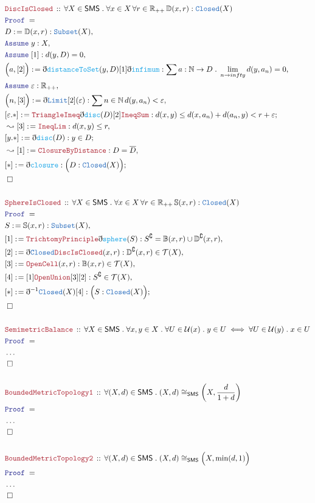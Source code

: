 \documentclass[12pt]{scrartcl}
\newcommand{\TYPE}[1]{\textcolor{NavyBlue}{\mathtt{#1}}}
\newcommand{\FUNC}[1]{\textcolor{Cerulean}{\mathtt{#1}}}
\newcommand{\LOGIC}[1]{\textcolor{Blue}{\mathtt{#1}}}
\newcommand{\THM}[1]{\textcolor{Maroon}{\mathtt{#1}}}
\renewcommand{\.}{\; . \;}
\newcommand{\de}{: \kern 0.1pc =}
\newcommand{\Theorem}[2]{& \THM{#1} \, :: \, #2 \\ & \Proof = \\ }
\newcommand{\Page}[1]{ \begin{align*} #1 \end{align*}   }
\newcommand{ \bd }{ \ByDef }
\newcommand{\NoProof}{ & \ldots \\ \EndProof}
\newcommand{\Reals}{\mathbb{R} }
\newcommand{\Nat}{\mathbb{N} }
\renewcommand{\c}{\complement}
\newcommand{\Say}[3]{& #1 \de #2 : #3, \\}
\newcommand{\Conclude}[3]{& #1 \de #2 : #3; \\}
\newcommand{\Derive}[3]{& \leadsto #1 \de #2 : #3, \\}
\newcommand{\Assume}[2]{& \LOGIC{Assume} \; #1 : #2, \\}
\newcommand{\QED}{\; \square}
\newcommand{\EndProof}{& \QED \\}
\newcommand{\ByDef}{\eth}
\newcommand{\Proof}{\LOGIC{Proof} \; }
\newcommand{\T}{\mathcal{T}}
\renewcommand{\U}{\mathcal{U}}
\newcommand{\SMS}{\mathsf{SMS}}
\begin{document}
\Page{
	\Theorem{DiscIsClosed}
	{
		\forall X \in \SMS \. \forall x \in X \, \forall r \in \Reals_{++} \, \mathbb{D}(x,r) : \TYPE{Closed}(X)
	}
	\Say{D}{\mathbb{D}(x,r)}{\TYPE{Subset}(X)}
	\Assume{y}{X}
	\Assume{[1]}{d(y,D) = 0}
	\Say{\Big(a,[2] \Big)}{\bd \FUNC{distanceToSet}(y,D)[1]\bd \FUNC{infimum}}{\sum a : \Nat \to D \. \lim_{n \to infty} d(y, a_n) = 0}
	\Assume{\varepsilon}{\Reals_{++}}
	\Say{\Big(n,[3]\Big)}{\bd \TYPE{Limit}[2](\varepsilon)}{\sum n \in \Nat \, d(y,a_n) < \varepsilon}
	\Conclude{[\varepsilon.*]}{\THM{TriangleIneq}\bd \FUNC{disc}(D) [2] \THM{IneqSum}}{d(x,y) \le d(x,a_n) + d(a_n,y) <  r + \varepsilon}
	\Derive{[3]}{\THM{IneqLim}}{d(x,y) \le r }
	\Conclude{[y.*]}{\bd \FUNC{disc}(D)}{y \in D }
	\Derive{[1]}{\THM{ClosureByDistance}}{D = \overline{D}}
	\Conclude{[*]}{\bd \FUNC{closure}}{\Big( D : \TYPE{Closed}(X) \Big)}
	\EndProof
	\\
	\Theorem{SphereIsClosed}
	{
		\forall X \in \SMS \. \forall x \in X \, \forall r \in \Reals_{++} \, \mathbb{S}(x,r) : \TYPE{Closed}(X)
	}
	\Say{S}{\mathbb{S}(x,r)}{\TYPE{Subset}(X)}
	\Say{[1]}{\THM{TrichtomyPrinciple}\bd \FUNC{sphere}(S)}{S^\c = \mathbb{B}(x,r) \cup \mathbb{D}^\c(x,r)}
	\Say{[2]}{\bd  \TYPE{Closed} \THM{DiscIsClosed}(x,r)}{\mathbb{D}^\c(x,r) \in \T(X)}
	\Say{[3]}{\THM{OpenCell}(x,r)}{\mathbb{B}(x,r) \in \T(X)}
	\Say{[4]}{ [1] \THM{OpenUnion}[3] [2]  }{S^\c  \in \T(X)}
	\Conclude{[*]}{\bd^{-1} \TYPE{Closed}(X)[4]}{\Big(S : \TYPE{Closed}(X) \Big) }
	\EndProof
	\\
	\Theorem{SemimetricBalance}
	{
		\forall X \in \SMS \. \forall x,y \in X \. 
		\forall U \in \U(x) \. y \in U \iff \forall U \in \U(y) \. x \in U  
	}
	\NoProof
	\\
	\Theorem{BoundedMetricTopology1}{\forall (X,d) \in \SMS \.   (X,d)  \cong_{\SMS} \left(X, \frac{d}{1 + d}\right) }
	\NoProof
	\\
	\Theorem{BoundedMetricTopology2}{\forall (X,d) \in \SMS \. (X,d) \cong_{\SMS} \Big(X,\min(d,1)\Big)}
	\NoProof
}
\end{document}

